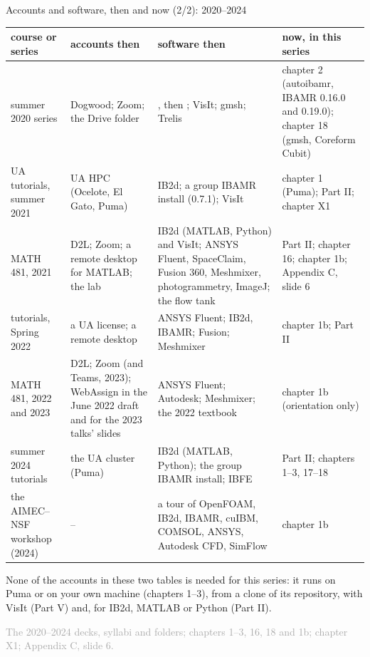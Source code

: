 \documentclass[aspectratio=169,11pt]{beamer}
\newcommand{\sourcecredit}[1]{\vfill\begin{flushright}\tiny\textcolor{DarkGray}{#1}\end{flushright}}
\begin{document}
\begin{frame}{Accounts and software, then and now (2/2): 2020--2024}
\label{fr:accounts2}
\tiny
\renewcommand{\arraystretch}{1.25}
\setlength{\tabcolsep}{3pt}
\begin{tabular}{@{}L{0.14\textwidth}L{0.23\textwidth}L{0.29\textwidth}L{0.28\textwidth}@{}}
\toprule
course or series & accounts then & software then & now, in this series \\
\midrule
summer 2020 series & Dogwood; Zoom; the Drive folder & , then ; VisIt; gmsh; Trelis & chapter 2 (autoibamr, IBAMR 0.16.0 and 0.19.0); chapter 18 (gmsh, Coreform Cubit) \\
UA tutorials, summer 2021 & UA HPC (Ocelote, El Gato, Puma) & IB2d; a group IBAMR install (0.7.1); VisIt & chapter 1 (Puma); Part II; chapter X1 \\
MATH 481, 2021 & D2L; Zoom; a remote desktop for MATLAB; the lab & IB2d (MATLAB, Python) and VisIt; ANSYS Fluent, SpaceClaim, Fusion 360, Meshmixer, photogrammetry, ImageJ; the flow tank & Part II; chapter 16; chapter 1b; Appendix C, slide 6 \\
tutorials, Spring 2022 & a UA license; a remote desktop & ANSYS Fluent; IB2d, IBAMR; Fusion; Meshmixer & chapter 1b; Part II \\
MATH 481, 2022 and 2023 & D2L; Zoom (and Teams, 2023); WebAssign in the June 2022 draft and for the 2023 talks' slides & ANSYS Fluent; Autodesk; Meshmixer; the 2022 textbook & chapter 1b (orientation only) \\
summer 2024 tutorials & the UA cluster (Puma) & IB2d (MATLAB, Python); the group IBAMR install; IBFE & Part II; chapters 1--3, 17--18 \\
the AIMEC--NSF workshop (2024) & -- & a tour of OpenFOAM, IB2d, IBAMR, cuIBM, COMSOL, ANSYS, Autodesk CFD, SimFlow & chapter 1b \\
\bottomrule
\end{tabular}

\vspace{2mm}
\begin{punchbox}
\footnotesize None of the accounts in these two tables is needed for this series: it runs on Puma or on your own machine (chapters 1--3), from a clone of its repository, with VisIt (Part V) and, for IB2d, MATLAB or Python (Part II).
\end{punchbox}
\sourcecredit{The 2020--2024 decks, syllabi and folders; chapters 1--3, 16, 18 and 1b; chapter X1; Appendix C, slide 6.}
\end{frame}
\end{document}
